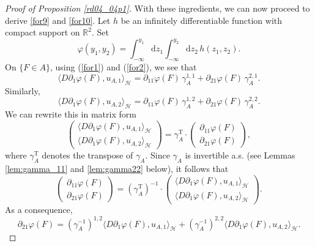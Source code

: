 \documentclass[12pt,a4paper]{article}
\newcommand{\R}{{\mathbb{R}}}
\newcommand{\HH}{\mathcal{H}}
\newcommand{\rT}{\text{T}}
\renewcommand{\d}{\mathrm{d}}
\newcommand{\<}{\langle}
\renewcommand{\>}{\rangle}
\begin{document}
\begin{proof}[Proof of Proposition \ref{rd04_04p1}]
  With these ingredients, we can now proceed to derive \eqref{for9} and \eqref{for10}.   Let $h$ be an infinitely differentiable function with compact support on $\R^2$. Set
  \begin{equation}\label{rd04_07e2}
  \varphi(y_1,y_2)= \int_{-\infty}^{y_1} \d z_1 \int_{-\infty}^{y_2} \d z_2 \, h(z_1,z_2) .
  \end{equation}
  On $\{F\in A\}$, using (\ref{for1}) and (\ref{for2}), we see that
  \begin{equation*}%
     \langle D\partial_1 \varphi(F), u_{A,1}\rangle_\HH= \partial_{11} \varphi(F)\, \gamma_{A}^{1,1} + \partial_{21} \varphi(F)\, \gamma_{A}^{2,1}.
  \end{equation*}
  Similarly,
   \begin{equation*}%
     \langle D\partial_1 \varphi(F), u_{A,2}\rangle_\HH= \partial_{11} \varphi(F)\, \gamma_{A}^{1,2} + \partial_{21} \varphi(F)\, \gamma_{A}^{2,2}.
   \end{equation*}
  We can rewrite this in matrix form
    \[
    \left(\begin{array}{cc}
    \langle D\partial_1 \varphi(F), u_{A,1}\rangle_\HH \\ \langle D\partial_1 \varphi(F), u_{A,2}\rangle_\HH
           \end{array} \right) = \gamma_A^\rT \cdot \left(\begin{array}{cc}
           \partial_{11} \varphi(F) \\  \partial_{21} \varphi(F) \end{array} \right),
   \]
  where $\gamma_A^\rT$ denotes the transpose of $\gamma_A$.   Since $\gamma_A$ is invertible a.s. (see Lemmas \ref{lem:gamma_11} and \ref{lem:gamma22} below), it follows that
    \[
   \left(\begin{array}{cc}
           \partial_{11} \varphi(F) \\  \partial_{21} \varphi(F) \end{array} \right) = (\gamma_A^\rT)^{-1} \cdot 
            \left(\begin{array}{cc} 
            \langle D\partial_1 \varphi(F), u_{A,1}\rangle_\HH \\ \langle D\partial_1 \varphi(F), u_{A,2}\rangle_\HH
           \end{array} \right).
 \]
As a consequence,
 \begin{equation}\label{rd05_20e1}
   \partial_{21} \varphi(F) =  (\gamma_{A}^{-1})^{1,2}\langle D\partial_1 \varphi(F), u_{A,1}\rangle_\HH +  (\gamma_{A}^{-1})^{2,2} \langle D\partial_1 \varphi(F), u_{A,2}\rangle_\HH.
\end{equation}
     

\end{proof}
\end{document}
